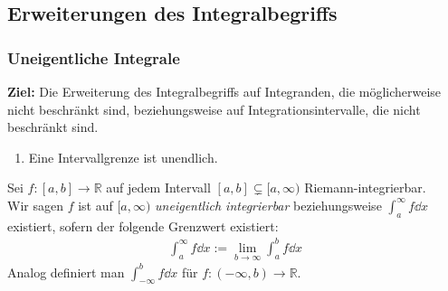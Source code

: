 \subsection{Erweiterungen des Integralbegriffs}

\subsubsection{Uneigentliche Integrale}

\textbf{Ziel:} Die Erweiterung des Integralbegriffs auf Integranden, die 
möglicherweise nicht beschränkt sind, beziehungsweise auf Integrationsintervalle, 
die nicht beschränkt sind.

\begin{enumerate}
	\item Eine Intervallgrenze ist unendlich.
\end{enumerate}

\begin{Definition}{
	Sei $f : [a,b] \rightarrow \mathbb{R}$ auf jedem Intervall $[a,b] \subsetneq
	[a, \infty)$ Riemann-integrierbar. \\
	Wir sagen $f$ ist auf $[a, \infty)$ \emph{uneigentlich integrierbar} 
	beziehungsweise $\int_a^{\infty} f \dd{x}$ existiert, sofern der 
	folgende Grenzwert existiert:
	\begin{align*}
		\int_a^{\infty} f \dd{x} := \lim\limits_{b \rightarrow \infty}
			{\int_a^b f \dd{x}}
	\end{align*}
	Analog definiert man $\int_{-\infty}^b f \dd{x}$ für $f: (-\infty, b)
	 \rightarrow \mathbb{R}$.
}\end{Definition}


